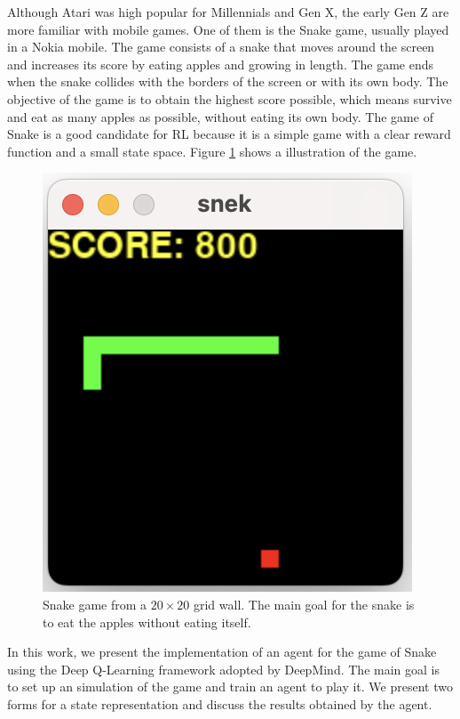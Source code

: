 \documentclass[conference]{IEEEtran}
\begin{document}
Although Atari was high popular for Millennials and Gen X, the early Gen Z are more familiar with mobile games. One of them is the Snake game, usually played in a Nokia mobile. The game consists of a snake that moves around the screen and increases its score by eating apples and growing in length. The game ends when the snake collides with the borders of the screen or with its own body. The objective of the game is to obtain the highest score possible, which means survive and eat as many apples as possible, without eating its own body. The game of Snake is a good candidate for RL because it is a simple game with a clear reward function and a small state space. Figure \ref{snake-game} shows a illustration of the game.

\begin{figure}[thpb]
   \centering
   \includegraphics[scale=0.5]{snake-2.png}
   \caption{Snake game from a $20\times20$ grid wall. The main goal for the snake is to eat the apples without eating itself.}
   \label{snake-game}
\end{figure}

In this work, we present the implementation of an agent for the game of Snake using the Deep Q-Learning framework adopted by DeepMind. The main goal is to set up an simulation of the game and train an agent to play it. We present two forms for a state representation and discuss the results obtained by the agent.
\end{document}
